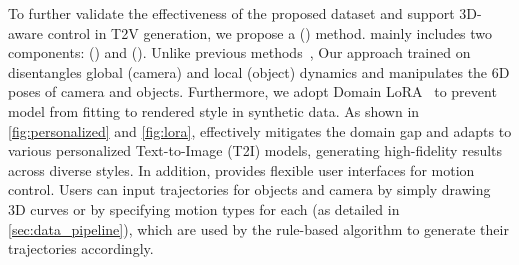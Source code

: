 To further validate the effectiveness of the proposed \datasetname dataset and support {3D-aware control} in T2V generation, we propose a \methodcompletename (\methodname) method. \methodname mainly includes two components: \camctrlcompletename (\camctrlname) and \objctrlcompletename (\objctrlname). Unlike previous methods~\cite{DragNUWA,MotionCtrl}, {Our approach trained on \datasetname disentangles global (camera) and local (object) dynamics and manipulates the 6D poses of camera and objects}. Furthermore, we adopt Domain LoRA~\cite{LoRA} to prevent model from fitting to rendered style in synthetic data. As shown in \cref{fig:personalized} and \cref{fig:lora}, \methodname effectively mitigates the domain gap and adapts to various personalized Text-to-Image (T2I) models, generating high-fidelity results across diverse styles. In addition, \methodname provides flexible user interfaces for motion control. Users can input trajectories for objects and camera by simply drawing 3D curves or by specifying motion types for each (as detailed in \cref{sec:data_pipeline}), which are used by the rule-based algorithm to generate their trajectories accordingly.

